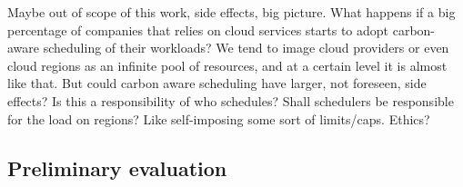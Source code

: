 Maybe out of scope of this work, side effects, big picture.
What happens if a big percentage of companies that relies on cloud services starts to adopt carbon-aware scheduling of their workloads?
We tend to image cloud providers or even cloud regions as an infinite pool of resources, and at a certain level it is almost like that. But could carbon aware scheduling have larger, not foreseen, side effects?
Is this a responsibility of who schedules? Shall schedulers be responsible for the load on regions? Like self-imposing some sort of limits/caps. Ethics?

\subsection{Preliminary evaluation}

\begin{comment}
for the purpose of this theses

boavizta API simulation

assumptions
- analysis limited to only cloud VM, (aligned with the scope of this theses)
- data related to GCP is not data from boavizta (even if gcp is supported in our current system) but mapped from azure and aws

limitations
- whole countries, not regions


not easily integratable in a real production system due to its quite restrictive license (AGPL 3)
it is still usable for research purposes like in this case.
\end{comment}






\newpage

